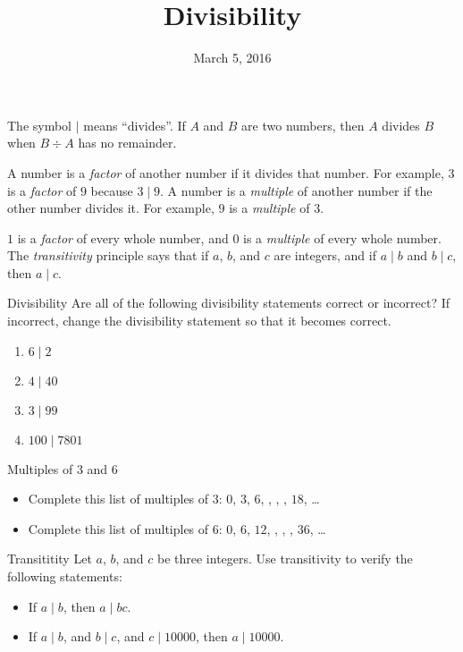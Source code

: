 \documentclass[12pt,letterpaper]{article}
\title{Divisibility}
\date{March 5, 2016}
\begin{document}
\maketitle

\thispagestyle{empty}

The symbol \(\mid\) means ``divides''. If \(A\) and \(B\) are two numbers, then
\(A\) divides \(B\) when \(B \div A\) has no remainder.

A number is a \emph{factor} of another number if it divides that number. For
example, \(3\) is a \emph{factor} of \(9\) because \(3 \mid 9\). A number is a
\emph{multiple} of another number if the other number divides it. For example,
\(9\) is a \emph{multiple} of \(3\).

\(1\) is a \emph{factor} of every whole number, and \(0\) is a \emph{multiple}
of every whole number. The \emph{transitivity} principle says that if \(a\),
\(b\), and \(c\) are integers, and if \(a \mid b\) and \(b \mid c\), then \(a
\mid c\).

\begin{problem}{Divisibility}
 Are all of the following divisibility statements correct or incorrect? If
 incorrect, change the divisibility statement so that it becomes correct.

 \begin{enumerate}
  \item \(6 \mid 2\)
  \item \(4 \mid 40\)
  \item \(3 \mid 99\)
  \item \(100 \mid 7801\)
 \end{enumerate}
\end{problem}

\begin{problem}{Multiples of \(3\) and \(6\)}
 \begin{itemize}
  \item Complete this list of multiples of \(3\): \(0\), \(3\), \(6\),
  \blankB, \blankB, \blankB,
  \(18\), \ldots

  \item Complete this list of multiples of \(6\): \(0\), \(6\), \(12\),
  \blankB, \blankB, \blankB,
  \(36\), \ldots
 \end{itemize}
\end{problem}

\begin{problem}{Transititity}
 Let \(a\), \(b\), and \(c\) be three integers. Use transitivity to verify the
 following statements:
 \begin{itemize}
  \item If \(a \mid b\), then \(a \mid bc\).
  \item If \(a \mid b\), and \(b \mid c\), and \(c \mid 10000\), then \(a \mid
  10000\).
 \end{itemize}
\end{problem}
\end{document}
